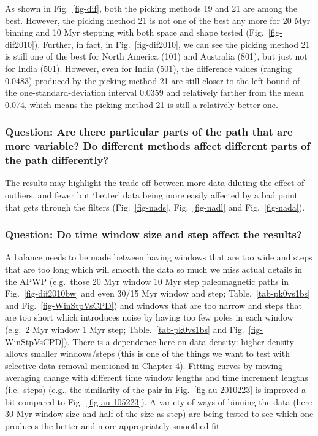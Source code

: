 As shown in Fig.~\ref{fig-dif}, both the picking methods 19 and 21 are among the
best. However, the picking method 21 is not one of the best any more for 20 Myr
binning and 10 Myr stepping with both space and shape tested
(Fig.~\ref{fig-dif2010}). Further, in fact, in Fig.~\ref{fig-dif2010}, we can
see the picking method 21 is still one of the best for North America (101) and
Australia (801), but just not for India (501). However, even for India (501),
the difference values (ranging 0.0483) produced by the picking
method 21 are still closer to the left bound of the one-standard-deviation
interval 0.0359 and relatively farther from the mean 0.074,
which means the picking method 21 is still a relatively better one.


\subsubsection{Question: Are there particular parts of the path that are more
variable? Do different methods affect different parts of the path differently?}

The results may highlight the trade-off between more data diluting the effect of
outliers, and fewer but `better' data being more easily affected by a bad point
that gets through the filters (Fig.~\ref{fig-nads}, Fig.~\ref{fig-nadl} and
Fig.~\ref{fig-nada}).

\subsubsection{Question: Do time window size and step affect the results?}

A balance needs to be made between having windows that are too wide and steps
that are too long which will smooth the data so much we miss actual details in
the APWP (e.g.\ those 20 Myr window 10 Myr step paleomagnetic paths in
Fig.~\ref{fig-dif2010bw} and even 30/15 Myr window and step;
Table.~\ref{tab-pk0vs1bs} and Fig.~\ref{fig-WinStpVsCPD}) and windows that are
too narrow and steps that are too short which introduces noise by having too few
poles in each window (e.g.\ 2 Myr window 1 Myr step; Table.~\ref{tab-pk0vs1bs}
and Fig.~\ref{fig-WinStpVsCPD}). There is a dependence here on data density:
higher density allows smaller windows/steps (this is one of the things we want
to test with selective data removal mentioned in Chapter 4). Fitting curves by
moving averaging change with different time window lengths and time increment
lengths (i.e.\ steps) (e.g., the similarity of the pair in
Fig.~\ref{fig-au-2010223} is improved a bit compared to
Fig.~\ref{fig-au-105223}). A variety of ways of binning the data (here
30 Myr window size and half of the size as step) are being tested to
see which one produces the better and more appropriately smoothed fit.

